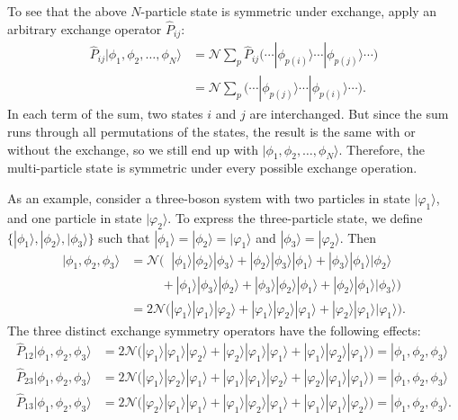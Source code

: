 \documentclass[pra,12pt]{revtex4}
\begin{document}
To see that the above $N$-particle state is symmetric under exchange,
apply an arbitrary exchange operator $\hat{P}_{ij}$:
$$\begin{aligned}\hat{P}_{ij}|\phi_1,\phi_2,\dots,\phi_N\rangle &= \mathcal{N} \sum_p \hat{P}_{ij} \Big(\cdots  |\phi_{p(i)}\rangle  \cdots  |\phi_{p(j)}\rangle\cdots\Big) \\&= \mathcal{N} \sum_p \Big(\cdots  |\phi_{p(j)}\rangle  \cdots  |\phi_{p(i)}\rangle\cdots\Big).\end{aligned}$$
In each term of the sum, two states $i$ and $j$ are interchanged.  But
since the sum runs through all permutations of the states, the result
is the same with or without the exchange, so we still end up with
$|\phi_1,\phi_2,\dots,\phi_N\rangle$.  Therefore, the multi-particle
state is symmetric under every possible exchange operation.

As an example, consider a three-boson system with two particles in
state $|\varphi_1\rangle$, and one particle in state
$|\varphi_2\rangle$.  To express the three-particle state, we define
$\{|\phi_1\rangle, |\phi_2\rangle, |\phi_3\rangle\}$ such that
$|\phi_1\rangle = |\phi_2\rangle = |\varphi_1\rangle$ and
$|\phi_3\rangle = |\varphi_2\rangle$.  Then
$$\begin{aligned}|\phi_1,\phi_2,\phi_3\rangle &= \mathcal{N} \Big( \;\;
|\phi_1\rangle|\phi_2\rangle|\phi_3\rangle +
|\phi_2\rangle|\phi_3\rangle|\phi_1\rangle +
|\phi_3\rangle|\phi_1\rangle|\phi_2\rangle \\ &\qquad\;\, +
|\phi_1\rangle|\phi_3\rangle|\phi_2\rangle +
|\phi_3\rangle|\phi_2\rangle|\phi_1\rangle +
|\phi_2\rangle|\phi_1\rangle|\phi_3\rangle\Big) \\
&= 2\mathcal{N} \Big(
|\varphi_1\rangle|\varphi_1\rangle|\varphi_2\rangle +
|\varphi_1\rangle|\varphi_2\rangle|\varphi_1\rangle +
|\varphi_2\rangle|\varphi_1\rangle|\varphi_1\rangle\Big).
\end{aligned}$$
The three distinct exchange symmetry operators have the following effects:
$$\begin{aligned}\hat{P}_{12}|\phi_1,\phi_2,\phi_3\rangle &= 2\mathcal{N} \Big(
|\varphi_1\rangle|\varphi_1\rangle|\varphi_2\rangle +
|\varphi_2\rangle|\varphi_1\rangle|\varphi_1\rangle +
|\varphi_1\rangle|\varphi_2\rangle|\varphi_1\rangle\Big) = |\phi_1,\phi_2,\phi_3\rangle \\
\hat{P}_{23}|\phi_1,\phi_2,\phi_3\rangle &= 2\mathcal{N} \Big(
|\varphi_1\rangle|\varphi_2\rangle|\varphi_1\rangle +
|\varphi_1\rangle|\varphi_1\rangle|\varphi_2\rangle +
|\varphi_2\rangle|\varphi_1\rangle|\varphi_1\rangle\Big) = |\phi_1,\phi_2,\phi_3\rangle\\
\hat{P}_{13}|\phi_1,\phi_2,\phi_3\rangle &= 2\mathcal{N} \Big(
|\varphi_2\rangle|\varphi_1\rangle|\varphi_1\rangle +
|\varphi_1\rangle|\varphi_2\rangle|\varphi_1\rangle +
|\varphi_1\rangle|\varphi_1\rangle|\varphi_2\rangle\Big) = |\phi_1,\phi_2,\phi_3\rangle.
\end{aligned}$$
\end{document}

